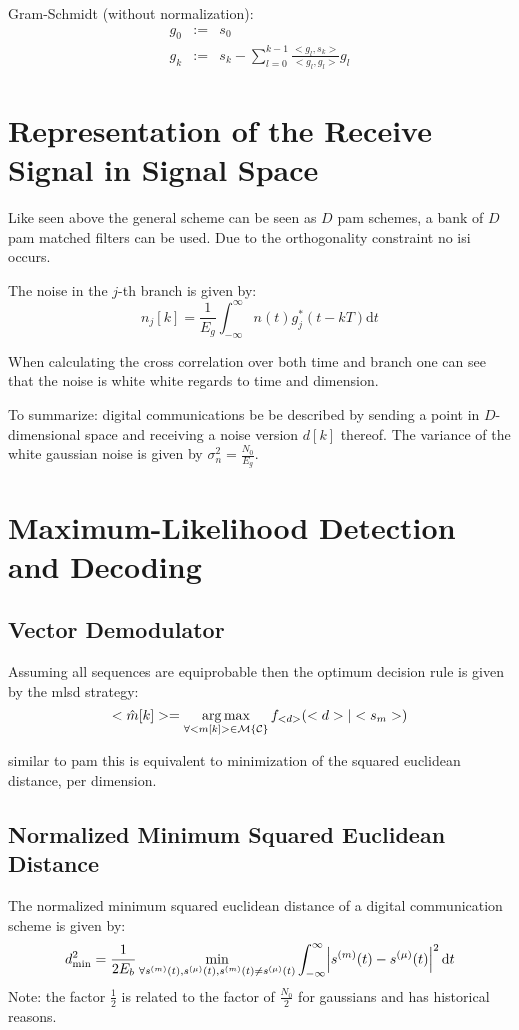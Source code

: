 Gram-Schmidt (without normalization):
\begin{eqnarray*}
    g_0 &:=& s_0 \\
    g_k &:=& s_k - \sum_{l=0}^{k-1} \frac{<g_l, s_k>}{<g_l, g_l>} g_l
\end{eqnarray*}

\section{Representation of the Receive Signal in Signal Space}
Like seen above the general scheme can be seen as $D$ \ac{pam} schemes, a bank of 
$D$ \ac{pam} matched filters can be used. Due to the orthogonality constraint
no \ac{isi} occurs.

The noise in the $j$-th branch is given by:
\begin{equation}
    n_j[k] = \frac{1}{E_g} \int_{-\infty}^\infty n(t) g_j^*(t-kT) \text{d}t
\end{equation}

When calculating the cross correlation over both time and branch one can see that
the noise is white white regards to time and dimension.

To summarize: digital communications be be described by sending a point in $D$-dimensional
space and receiving a noise version $d[k]$ thereof. The variance of the white
gaussian noise is given by $\sigma_n^2 = \frac{N_0}{E_g}$.

\section{Maximum-Likelihood Detection and Decoding}
\subsection{Vector Demodulator}
Assuming all sequences are equiprobable then the optimum decision rule is given
by the \ac{mlsd} strategy:
\begin{equation}
    <\hat{m}[k]> = \operatorname*{arg\,max}_{\forall <m[k]> \in \mathcal{M}\{\mathcal{C}\}} f_{<d>} (<d> | <s_m>)
\end{equation}

similar to \ac{pam} this is equivalent to minimization of the squared euclidean distance,
per dimension.

\subsection{Normalized Minimum Squared Euclidean Distance}
The normalized minimum squared euclidean distance of a digital communication scheme
is given by:
\begin{equation}
    d_\text{min}^2 = \frac{1}{2 E_b} \min_{\forall s^{(m)}(t), s^{(\mu)}(t),
        s^{(m)}(t) \neq s^{(\mu)}(t)} \int_{-\infty}^\infty
        \abs{s^{(m)}(t) - s^{(\mu)}(t)}^2 \text{d}t
\end{equation}
Note: the factor $\frac{1}{2}$ is related to the factor of $\frac{N_0}{2}$ for gaussians
and has historical reasons.


